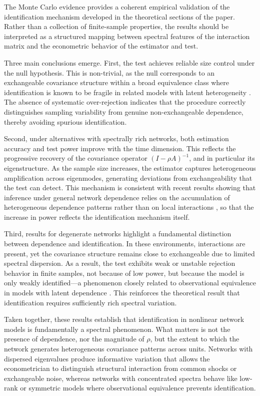 \documentclass[12pt]{article}
\numberwithin{equation}{section}
\begin{document}
The Monte Carlo evidence provides a coherent empirical validation of the identification mechanism developed in the theoretical sections of the paper. Rather than a collection of finite-sample properties, the results should be interpreted as a structured mapping between spectral features of the interaction matrix and the econometric behavior of the estimator and test.

Three main conclusions emerge. First, the test achieves reliable size control under the null hypothesis. This is non-trivial, as the null corresponds to an exchangeable covariance structure within a broad equivalence class where identification is known to be fragile in related models with latent heterogeneity \citep{ghosh2024identifiability}. The absence of systematic over-rejection indicates that the procedure correctly distinguishes sampling variability from genuine non-exchangeable dependence, thereby avoiding spurious identification.

Second, under alternatives with spectrally rich networks, both estimation accuracy and test power improve with the time dimension. This reflects the progressive recovery of the covariance operator $(I - \rho A)^{-1}$, and in particular its eigenstructure. As the sample size increases, the estimator captures heterogeneous amplification across eigenmodes, generating deviations from exchangeability that the test can detect. This mechanism is consistent with recent results showing that inference under general network dependence relies on the accumulation of heterogeneous dependence patterns rather than on local interactions \citep{jiang2025networkclt}, so that the increase in power reflects the identification mechanism itself.

Third, results for degenerate networks highlight a fundamental distinction between dependence and identification. In these environments, interactions are present, yet the covariance structure remains close to exchangeable due to limited spectral dispersion. As a result, the test exhibits weak or unstable rejection behavior in finite samples, not because of low power, but because the model is only weakly identified—a phenomenon closely related to observational equivalence in models with latent dependence \citep{ghosh2024identifiability}. This reinforces the theoretical result that identification requires sufficiently rich spectral variation.

Taken together, these results establish that identification in nonlinear network models is fundamentally a spectral phenomenon. What matters is not the presence of dependence, nor the magnitude of $\rho$, but the extent to which the network generates heterogeneous covariance patterns across units. Networks with dispersed eigenvalues produce informative variation that allows the econometrician to distinguish structural interaction from common shocks or exchangeable noise, whereas networks with concentrated spectra behave like low-rank or symmetric models where observational equivalence prevents identification.
\end{document}
